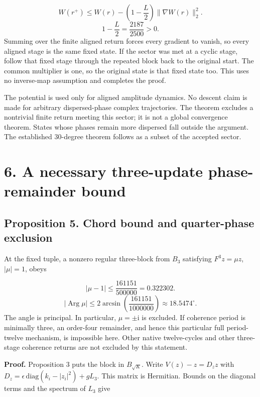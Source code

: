 \documentclass[11pt,a4paper]{article}
\begin{document}
\begin{equation}W(r^+)\leq W(r)-\left(1-\frac{L}{2}\right)\|\nabla W(r)\|_2^2.\end{equation}
\begin{equation}1-\frac{L}{2}=\frac{2187}{2500}>0.\end{equation}
Summing over the finite aligned return forces every gradient to vanish, so every aligned stage is the same fixed state. If the sector was met at a cyclic stage, follow that fixed stage through the repeated block back to the original start. The common multiplier is one, so the original state is that fixed state too. This uses no inverse-map assumption and completes the proof.

The potential is used only for aligned amplitude dynamics. No descent claim is made for arbitrary dispersed-phase complex trajectories. The theorem excludes a nontrivial finite return meeting this sector; it is not a global convergence theorem. States whose phases remain more dispersed fall outside the argument. The established 30-degree theorem follows as a subset of the accepted sector.

\clearpage
\section*{6. A necessary three-update phase-remainder bound}
\subsection*{Proposition 5. Chord bound and quarter-phase exclusion}
At the fixed tuple, a nonzero regular three-block from $B_3$ satisfying $F^3z=\mu z$, $|\mu|=1$, obeys

\begin{equation}|\mu-1|\leq\frac{161151}{500000}=0.322302.\end{equation}
\begin{equation}|\operatorname{Arg}\mu|\leq2\arcsin\left(\frac{161151}{1000000}\right)\approx18.5474^\circ.\end{equation}
The angle is principal. In particular, $\mu=\pm\mathrm{i}$ is excluded. If coherence period is minimally three, an order-four remainder, and hence this particular full period-twelve mechanism, is impossible here. Other native twelve-cycles and other three-stage coherence returns are not excluded by this statement. \cite{D03}

\textbf{Proof.} Proposition 3 puts the block in $B_{\sqrt{K}}$. Write $V(z)-z=D_z z$ with $D_z=\epsilon\,\mathrm{diag}(k_i-|z_i|^2)+gL_3$. This matrix is Hermitian. Bounds on the diagonal terms and the spectrum of $L_3$ give
\end{document}

